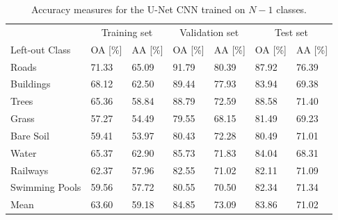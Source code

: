 \documentclass[10pt]{article}
\begin{document}
\begin{table}[H]
    \centering
    \begin{tabular}{lllllll}
    \toprule
                     & \multicolumn{2}{c}{Training set} & \multicolumn{2}{c}{Validation set} & \multicolumn{2}{c}{Test set}\\
    Left-out Class   & \gls{OA} [\%]  & \gls{AA}  [\%] & \gls{OA} [\%]  & \gls{AA}  [\%] & \gls{OA} [\%]  & \gls{AA}  [\%]\\\midrule
    Roads          &     71.33 &     65.09 &   91.79 &   80.39 &    87.92 &    76.39 \\
    Buildings      &     68.12 &     62.50 &   89.44 &   77.93 &    83.94 &    69.38 \\
    Trees          &     65.36 &     58.84 &   88.79 &   72.59 &    88.58 &    71.40 \\
    Grass          &     57.27 &     54.49 &   79.55 &   68.15 &    81.49 &    69.23 \\
    Bare Soil      &     59.41 &     53.97 &   80.43 &   72.28 &    80.49 &    71.01 \\
    Water          &     65.37 &     62.90 &   85.73 &   71.83 &    84.04 &    68.31 \\
    Railways       &     62.37 &     57.96 &   82.55 &   71.02 &    82.11 &    71.09 \\
    Swimming Pools &     59.56 &     57.72 &   80.55 &   70.50 &    82.34 &    71.34 \\\midrule
    Mean           &  63.60 &  59.18 &  84.85 &  73.09 &  83.86 &  71.02 \\\bottomrule
    \end{tabular}
    \caption{Accuracy measures for the U-Net \gls{CNN} trained on $N-1$ classes.}
    \label{table:zurich-cnn-acc-nd}
\end{table}
\end{document}

